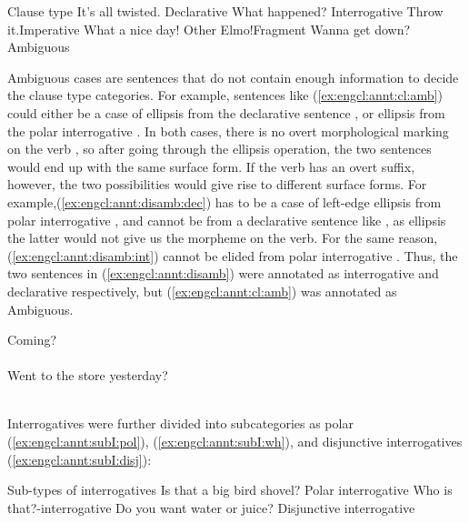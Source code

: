 Clause type
\bxl
\label{ex:engcl:annt:cl:decl}
It’s all twisted. \hfill Declarative
\ex \label{ex:engcl:annt:cl:int} What happened?	\hfill Interrogative
\ex \label{ex:engcl:annt:cl:imp} Throw it.\hfill Imperative
\ex \label{ex:engcl:annt:cl:other} What a nice day! \hfill Other
\ex \label{ex:engcl:annt:cl:frag}	Elmo!\hfill	Fragment
\ex \label{ex:engcl:annt:cl:amb} Wanna get down?	\hfill Ambiguous
\exl
\eex

Ambiguous cases are sentences that do not contain enough information to decide the clause type categories. For example, sentences like (\ref{ex:engcl:annt:cl:amb}) could either be a case of ellipsis from the declarative sentence , or ellipsis from the polar interrogative . In both cases, there is no overt morphological marking on the verb , so after going through the ellipsis operation, the two sentences would end up with the same surface form. If the verb has an overt suffix, however, the two possibilities would give rise to different surface forms. For example,(\ref{ex:engcl:annt:disamb:dec}) has to be a case of left-edge ellipsis from polar interrogative , and cannot be from a declarative sentence like , as ellipsis the latter would not give us the  morpheme on the verb. For the same reason, (\ref{ex:engcl:annt:disamb:int}) cannot be elided from polar interrogative . Thus, the two sentences in (\ref{ex:engcl:annt:disamb}) were annotated as interrogative and declarative respectively, but (\ref{ex:engcl:annt:cl:amb}) was annotated as Ambiguous.

\bxl\label{ex:engcl:annt:disamb:dec} Coming? \\
\cmark {}\\
\xmark {}
\ex \label{ex:engcl:annt:disamb:int} Went to the store yesterday? \\
\cmark {}\\
\xmark {}
\exl
\eex

Interrogatives were further divided into subcategories as polar (\ref{ex:engcl:annt:subI:pol}), \twh{} (\ref{ex:engcl:annt:subI:wh}), and disjunctive interrogatives (\ref{ex:engcl:annt:subI:disj}):

	Sub-types of interrogatives
\bxl\label{ex:engcl:annt:subI:pol}
Is that a big bird shovel? \hfill	Polar interrogative
\ex\label{ex:engcl:annt:subI:wh}	Who is that?\hfill	\twh-interrogative
\ex\label{ex:engcl:annt:subI:disj}	Do you want water or juice? \hfill Disjunctive interrogative
\exl
\eex

